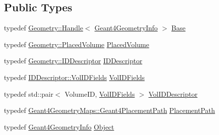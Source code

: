 \subsection*{Public Types}
\begin{DoxyCompactItemize}
\item 
typedef \hyperlink{class_d_d4hep_1_1_handle}{Geometry::Handle}$<$ \hyperlink{class_d_d4hep_1_1_simulation_1_1_geant4_geometry_info}{Geant4GeometryInfo} $>$ \hyperlink{class_d_d4hep_1_1_simulation_1_1_geant4_volume_manager_a7c19ae032d35b5c68d35029f28fc1586}{Base}
\item 
typedef \hyperlink{class_d_d4hep_1_1_geometry_1_1_placed_volume}{Geometry::PlacedVolume} \hyperlink{class_d_d4hep_1_1_simulation_1_1_geant4_volume_manager_a5303c9cd0941b91ab010074947517bd6}{PlacedVolume}
\item 
typedef \hyperlink{class_d_d4hep_1_1_geometry_1_1_i_d_descriptor}{Geometry::IDDescriptor} \hyperlink{class_d_d4hep_1_1_simulation_1_1_geant4_volume_manager_af539708bee7b18130b2052cb92da0822}{IDDescriptor}
\item 
typedef \hyperlink{class_d_d4hep_1_1_geometry_1_1_i_d_descriptor_a6c4700a96f3a202eedaa25e54d5695ff}{IDDescriptor::VolIDFields} \hyperlink{class_d_d4hep_1_1_simulation_1_1_geant4_volume_manager_ae80cafd25a138d7c91c24cda4bc350b1}{VolIDFields}
\item 
typedef std::pair$<$ VolumeID, \hyperlink{class_d_d4hep_1_1_simulation_1_1_geant4_volume_manager_ae80cafd25a138d7c91c24cda4bc350b1}{VolIDFields} $>$ \hyperlink{class_d_d4hep_1_1_simulation_1_1_geant4_volume_manager_aeedd11a516f671331ec2a46f5d39768d}{VolIDDescriptor}
\item 
typedef \hyperlink{namespace_d_d4hep_1_1_simulation_1_1_geant4_geometry_maps_a8a325934adb143cb1cbc47dd030395ed}{Geant4GeometryMaps::Geant4PlacementPath} \hyperlink{class_d_d4hep_1_1_simulation_1_1_geant4_volume_manager_a990d8577e764541c4914263db1c6b0ca}{PlacementPath}
\item 
typedef \hyperlink{class_d_d4hep_1_1_simulation_1_1_geant4_geometry_info}{Geant4GeometryInfo} \hyperlink{class_d_d4hep_1_1_simulation_1_1_geant4_volume_manager_a0c6cb7e6e021022e0b22937e5fb6e009}{Object}
\end{DoxyCompactItemize}
